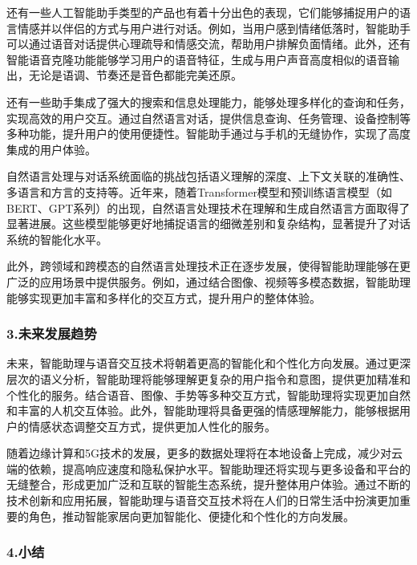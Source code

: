 还有一些人工智能助手类型的产品也有着十分出色的表现，它们能够捕捉用户的语言情感并以伴侣的方式与用户进行对话。例如，当用户感到情绪低落时，智能助手可以通过语音对话提供心理疏导和情感交流，帮助用户排解负面情绪。此外，还有智能语音克隆功能能够学习用户的语音特征，生成与用户声音高度相似的语音输出，无论是语调、节奏还是音色都能完美还原。


还有一些助手集成了强大的搜索和信息处理能力，能够处理多样化的查询和任务，实现高效的用户交互。通过自然语言对话，提供信息查询、任务管理、设备控制等多种功能，提升用户的使用便捷性。智能助手通过与手机的无缝协作，实现了高度集成的用户体验。

自然语言处理与对话系统面临的挑战包括语义理解的深度、上下文关联的准确性、多语言和方言的支持等。近年来，随着Transformer模型和预训练语言模型（如BERT、GPT系列）的出现，自然语言处理技术在理解和生成自然语言方面取得了显著进展。这些模型能够更好地捕捉语言的细微差别和复杂结构，显著提升了对话系统的智能化水平。

此外，跨领域和跨模态的自然语言处理技术正在逐步发展，使得智能助理能够在更广泛的应用场景中提供服务。例如，通过结合图像、视频等多模态数据，智能助理能够实现更加丰富和多样化的交互方式，提升用户的整体体验。

\subsubsection{3.未来发展趋势}

未来，智能助理与语音交互技术将朝着更高的智能化和个性化方向发展。通过更深层次的语义分析，智能助理将能够理解更复杂的用户指令和意图，提供更加精准和个性化的服务。结合语音、图像、手势等多种交互方式，智能助理将实现更加自然和丰富的人机交互体验。此外，智能助理将具备更强的情感理解能力，能够根据用户的情感状态调整交互方式，提供更加人性化的服务。

随着边缘计算和5G技术的发展，更多的数据处理将在本地设备上完成，减少对云端的依赖，提高响应速度和隐私保护水平。智能助理还将实现与更多设备和平台的无缝整合，形成更加广泛和互联的智能生态系统，提升整体用户体验。通过不断的技术创新和应用拓展，智能助理与语音交互技术将在人们的日常生活中扮演更加重要的角色，推动智能家居向更加智能化、便捷化和个性化的方向发展。

\subsubsection{4.小结}

